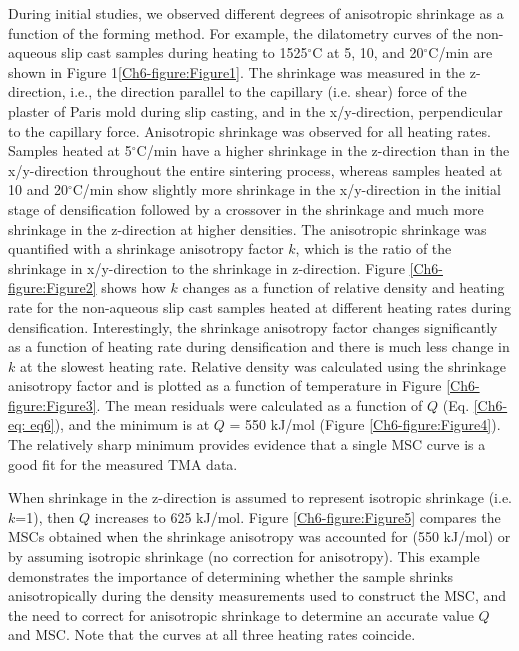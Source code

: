 During initial studies, we observed different degrees of anisotropic shrinkage as a function of the forming method. For example, the dilatometry curves of the non-aqueous slip cast samples during heating to 1525$^{\circ}$C at 5, 10, and 20$^{\circ}$C/min are shown in Figure 1\ref{Ch6-figure:Figure1}. The shrinkage was measured in the z-direction, i.e., the direction parallel to the capillary (i.e. shear) force of the plaster of Paris mold during slip casting, and in the x/y-direction, perpendicular to the capillary force. Anisotropic shrinkage was observed for all heating rates. Samples heated at 5$^{\circ}$C/min have a higher shrinkage in the z-direction than in the x/y-direction throughout the entire sintering process, whereas samples heated at 10 and 20$^{\circ}$C/min show slightly more shrinkage in the x/y-direction in the initial stage of densification followed by a crossover in the shrinkage and much more shrinkage in the z-direction at higher densities. The anisotropic shrinkage was quantified with a shrinkage anisotropy factor $k$, which is the ratio of the shrinkage in x/y-direction to the shrinkage in z-direction. Figure \ref{Ch6-figure:Figure2} shows how $k$ changes as a function of relative density and heating rate for the non-aqueous slip cast samples heated at different heating rates during densification. Interestingly, the shrinkage anisotropy factor changes significantly as a function of heating rate during densification and there is much less change in $k$ at the slowest heating rate. Relative density was calculated using the shrinkage anisotropy factor and is plotted as a function of temperature in Figure \ref{Ch6-figure:Figure3}. The mean residuals were calculated as a function of $Q$ (Eq. \ref{Ch6-eq: eq6}), and the minimum is at $Q$ = 550 kJ/mol (Figure \ref{Ch6-figure:Figure4}). The relatively sharp minimum provides evidence that a single MSC curve is a good fit for the measured TMA data. 

When shrinkage in the z-direction is assumed to represent isotropic shrinkage (i.e. $k$=1), then $Q$ increases to 625 kJ/mol. Figure \ref{Ch6-figure:Figure5} compares the MSCs obtained when the shrinkage anisotropy was accounted for (550 kJ/mol) or by assuming isotropic shrinkage (no correction for anisotropy). This example demonstrates the importance of determining whether the sample shrinks anisotropically during the density measurements used to construct the MSC, and the need to correct for anisotropic shrinkage to determine an accurate value $Q$ and MSC. Note that the curves at all three heating rates coincide.

